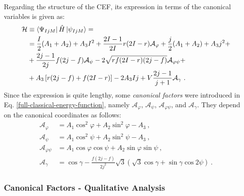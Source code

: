 Regarding the structure of the CEF, its expression in terms of the canonical variables is given as:
\begin{align}
    \mathcal{H}&\equiv\bra{\Psi_{IjM}}\hat{H}\ket{\psi_{IjM}}=\nonumber\\
    &=\frac{I}{2}(A_1+A_2)+A_3I^2+\frac{2I-1}{2I}r(2I-r)\mathcal{A}_\varphi+\frac{j}{2}(A_1+A_2)+A_3j^2+\nonumber\\
    &+\frac{2j-1}{2j}f(2j-f)\mathcal{A}_\psi-2\sqrt{rf(2I-r)(2j-f)}\mathcal{A}_{\varphi\psi}+\nonumber\\
    &+A_3\left[r(2j-f)+f(2I-r)\right]-2A_3Ij+V\frac{2j-1}{j+1}\mathcal{A}_\gamma\ .
    \label{full-classical-energy-function}    
\end{align}
Since the expression is quite lengthy, some \emph{canonical factors} were introduced in Eq. \ref{full-classical-energy-function}, namely $\mathcal{A}_\varphi$, $\mathcal{A}_\psi$, $\mathcal{A}_{\varphi\psi}$, and $\mathcal{A}_\gamma$. They depend on the canonical coordinates as follows:
\begin{align}
    \mathcal{A}_\varphi&=A_1\cos^2\varphi+A_2\sin^2\varphi-A_3\ ,\nonumber\\
    \mathcal{A}_\psi&=A_1\cos^2\psi+A_2\sin^2\psi-A_3\ ,\nonumber\\
    \mathcal{A}_{\varphi\psi}&=A_1\cos\varphi\cos\psi+A_2\sin\varphi\sin\psi\ ,\nonumber\\
    \mathcal{A}_\gamma&=\cos\gamma-\frac{f(2j-f)}{2j^2}\sqrt{3}\left(\sqrt{3}\cos\gamma+\sin\gamma\cos2\psi\right)\ .
    \label{classical-energy-function-A-factors}
\end{align}

\subsubsection{Canonical Factors - Qualitative Analysis}

